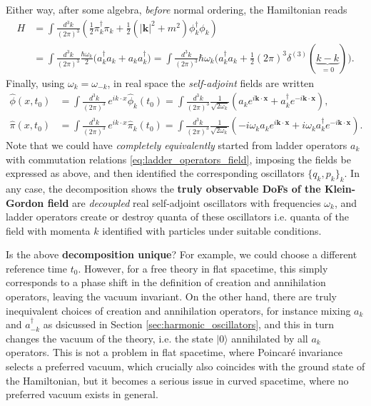 \documentclass[../QFT_main.tex]{subfiles}
\begin{document}
\begin{mytheorem}
Either way, after some algebra, \emph{before} normal ordering, the Hamiltonian reads
\begin{align}\label{eq:free_hamiltonian_ladder_operators}
    H  &= \int \frac{d^3 k}{(2\pi)^3} \left( \tfrac{1}{2}\pi_k^\dagger\pi_k + \tfrac{1}{2}(|\mathbf{k}|^2 + m^2) \phi_k^\dagger \phi_{k} \right) 
    \\
    & = \int \frac{d^3 k}{(2\pi)^3} \frac{\hbar\omega_k}{2} \Big( a_k^{\dagger} a_k + a_k a_k^\dagger\Big)
    = \int \frac{d^3 k}{(2\pi)^3} \hbar \omega_k \Big( a_k^{\dagger} a_k + \tfrac{1}{2} (2\pi)^3 \delta^{(3)}(\underbrace{k-k}_{=0}) \Big).
\end{align}
Finally, using $\omega_k=\omega_{-k}$, in real space the \emph{self-adjoint} fields are written
\begin{align}\label{eq:decompsition_field_ladder_operators_fixed_times}
    \hat{\phi}(x,t_0) &= \int \frac{d^3{k}}{(2\pi)^3}\, e^{i{k}\cdot{x}} \hat{\phi}_k(t_0)
    = \int \frac{d^3{k}}{(2\pi)^3} \frac{1}{\sqrt{2\omega_k}} \left( a_k e^{i \mathbf{k}\cdot\mathbf{x}} + a_k^{\dagger} e^{- i \mathbf{k}\cdot\mathbf{x}} \right),
    \\
    \hat{\pi}(x,t_0) &= \int \frac{d^3{k}}{(2\pi)^3}\, e^{i{k}\cdot{x}} \hat{\pi}_k(t_0)
    = \int \frac{d^3{k}}{(2\pi)^3} \frac{1}{\sqrt{2\omega_k}} \left( -i \omega_k a_k e^{i \mathbf{k}\cdot\mathbf{x}} + i \omega_k a_k^{\dagger} e^{- i \mathbf{k}\cdot\mathbf{x}} \right).
\end{align}
Note that we could have \emph{completely equivalently} started from ladder operators $a_k$ with commutation relations \eqref{eq:ladder_operators_field}, imposing the fields be expressed as above, and then identified the corresponding oscillators $\{q_k, p_k\}_k$.
In any case, the decomposition shows the \textbf{truly observable DoFs of the Klein-Gordon field} are \emph{decoupled} real self-adjoint oscillators with frequencies $\omega_k$, and ladder operators create or destroy quanta of these oscillators i.e. quanta of the field with momenta ${k}$ identified with particles under suitable conditions.

Is the above \textbf{decomposition unique}?
For example, we could choose a different reference time $t_0$. However, for a free theory in flat spacetime, this simply corresponds to a phase shift in the definition of creation and annihilation operators, leaving the vacuum invariant.
On the other hand, there are truly inequivalent choices of creation and annihilation operators, for instance mixing $a_k$ and $a_{-k}^\dagger$ as dsicussed in Section \ref{sec:harmonic_oscillators}, and this in turn changes the vacuum of the theory, i.e. the state $|0\rangle$ annihilated by all $a_k$ operators.
This is not a problem in flat spacetime, where Poincaré invariance selects a preferred vacuum, which crucially also coincides with the ground state of the Hamiltonian, but it becomes a serious issue in curved spacetime, where no preferred vacuum exists in general. 
%
\end{mytheorem}
\end{document}
